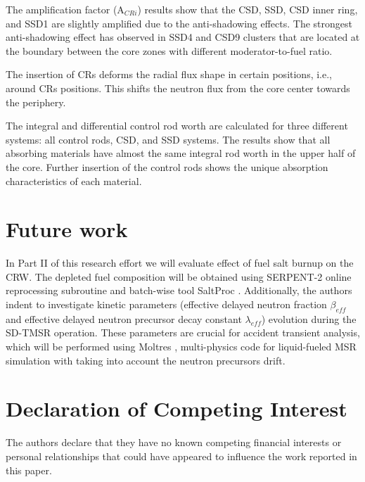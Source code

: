 The amplification factor (A$_{CRi}$) results show that the CSD, SSD, CSD inner ring, and SSD1 are slightly amplified due to the anti-shadowing effects. The strongest anti-shadowing effect has observed in SSD4 and CSD9 clusters that are located at the boundary between the core zones with different moderator-to-fuel ratio.

The insertion of CRs deforms the radial flux shape in certain positions, i.e., around CRs positions. This shifts the neutron flux from the core center towards the periphery.

The integral and differential control rod worth are calculated for three 
different systems: all control rods, CSD, and SSD systems. The results show 
that all absorbing materials have almost the same integral rod worth in the 
upper half of the core. Further insertion of the control rods shows the unique 
absorption characteristics of each material.

\section{Future work}
In Part II of this research effort we will evaluate effect of fuel salt 
burnup on the CRW. The depleted fuel composition will be obtained using 
SERPENT-2 online reprocessing subroutine \cite{aufiero2013extended} and 
batch-wise tool SaltProc \cite{rykhlevskii_arfc/saltproc_2018, 
rykhlevskii_milestone_2019}. Additionally, the authors indent to investigate 
kinetic parameters (effective delayed neutron fraction $\beta_{eff}$ and 
effective delayed neutron precursor decay constant $\lambda_{eff}$) evolution 
during the SD-TMSR operation. These parameters are crucial for accident 
transient analysis, which will be performed using Moltres 
\cite{lindsay_introduction_2018}, multi-physics code for liquid-fueled MSR 
simulation with taking into account the neutron precursors drift.





\section{Declaration of Competing Interest}

The authors declare that they have no known competing financial interests or personal relationships that could have appeared to influence the work reported in this paper.
